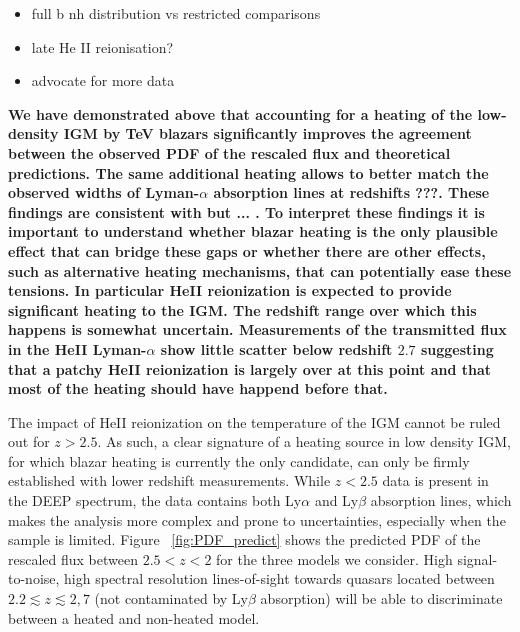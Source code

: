 \documentclass[numberedappendix]{emulateapj}
\newcommand\Ec[1]{{\color{magenta} \bf #1}} %
\begin{document}
\begin{itemize}
\item full b nh distribution vs restricted comparisons
\item late He II reionisation?
\item advocate for more data
\end{itemize}
\Ec{We have demonstrated above that accounting for a heating of the low-density IGM by TeV blazars significantly improves the agreement between the observed PDF of the rescaled flux and theoretical predictions. The same additional heating allows to better match the observed widths of Lyman-$\alpha$ absorption lines at redshifts ???. These findings are consistent with \citep{} but ... . To interpret these findings it is important to understand whether blazar heating is the only plausible effect that can bridge these gaps or whether there are other effects, such as alternative heating mechanisms, that can potentially ease these tensions. In particular HeII reionization is expected to provide significant heating to the IGM. The redshift range over which this happens is somewhat uncertain. Measurements of the transmitted flux in the HeII Lyman-$\alpha$ show little scatter below redshift $2.7$ \citep{2016ApJ...825..144W} suggesting that a patchy HeII reionization is largely over at this point and that most of the heating should have happend before that. }

The impact of HeII reionization on the temperature of the IGM cannot be ruled out for $z>2.5$. As such, a clear signature of a heating source in low density IGM, for which blazar heating is currently the only candidate, can only be firmly established with lower redshift measurements. While $z<2.5$ data is present in the DEEP spectrum, the data contains both Ly$\alpha$ and Ly$\beta$ absorption lines, which makes the analysis more complex and prone to uncertainties, especially when the sample is limited. Figure ~\ref{fig:PDF_predict} shows the predicted PDF of the rescaled flux between $2.5<z<2$ for the three models we consider. High signal-to-noise, high spectral resolution lines-of-sight towards quasars located between $2.2\lesssim z \lesssim 2,7$ (not contaminated by Ly$\beta$ absorption) will be able to discriminate between a heated and non-heated model. 
\end{document}
